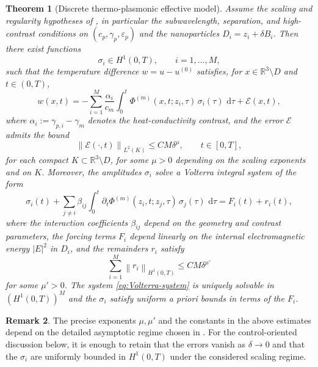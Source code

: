 \documentclass[11pt,a4paper]{article}
\numberwithin{equation}{section}
\newtheorem{theorem}{Theorem}[section]
\theoremstyle{definition}
\newtheorem{remark}[theorem]{Remark}
\newcommand{\R}{\mathbb{R}}
\newcommand{\eps}{\varepsilon}
\newcommand{\1}{\mathbbm{1}}
\newcommand{\dd}{\,\mathrm{d}}
\newcommand{\norm}[1]{\left\| #1 \right\|}
\begin{document}
\begin{theorem}[Discrete thermo-plasmonic effective model]
\label{thm:discrete-effective}
Assume the scaling and regularity hypotheses of \cite{CaoMukherjeeSini2025},
in particular the subwavelength, separation, and high-contrast conditions on
$(c_p,\gamma_p,\eps_p)$ and the nanoparticles $D_i = z_i + \delta B_i$.
Then there exist functions
\[
\sigma_i\in H^1(0,T),\qquad i=1,\dots,M,
\]
such that the temperature difference $w=u-u^{(0)}$ satisfies, for
$x\in\R^3\setminus D$ and $t\in(0,T)$,
\begin{equation}
\label{eq:discrete-expansion}
w(x,t) = -\sum_{i=1}^M \frac{\alpha_i}{c_m}\int_0^t
\Phi^{(m)}(x,t;z_i,\tau)\,\sigma_i(\tau)\,\dd\tau + \mathcal{E}(x,t),
\end{equation}
where $\alpha_i:=\gamma_{p,i}-\gamma_m$ denotes the heat-conductivity
contrast, and the error $\mathcal{E}$ admits the bound
\[
\norm{\mathcal{E}(\cdot,t)}_{L^2(K)} \le C M\delta^\mu,\qquad t\in[0,T],
\]
for each compact $K\subset\R^3\setminus D$, for some $\mu>0$ depending on
the scaling exponents and on $K$.
\newline
Moreover, the amplitudes $\sigma_i$ solve a Volterra integral system of the
form
\begin{equation}
\label{eq:Volterra-system}
\sigma_i(t) + \sum_{j\ne i}\beta_{ij} \int_0^t
\partial_t\Phi^{(m)}(z_i,t;z_j,\tau)\,\sigma_j(\tau)\,\dd\tau
= F_i(t) + r_i(t),
\end{equation}
where the interaction coefficients $\beta_{ij}$ depend on the geometry and
contrast parameters, the forcing terms $F_i$ depend linearly on the internal
electromagnetic energy $|E|^2$ in $D_i$, and the remainders $r_i$ satisfy
\[
\sum_{i=1}^M \norm{r_i}_{H^1(0,T)} \le C M\delta^{\mu'}
\]
for some $\mu'>0$. The system \eqref{eq:Volterra-system} is uniquely
solvable in $(H^1(0,T))^M$ and the $\sigma_i$ satisfy uniform a priori
bounds in terms of the $F_i$.
\end{theorem}

\begin{remark}
The precise exponents $\mu,\mu'$ and the constants in the above estimates
depend on the detailed asymptotic regime chosen in \cite{CaoMukherjeeSini2025}.
For the control-oriented discussion below, it is enough to retain that the
errors vanish as $\delta\to0$ and that the $\sigma_i$ are uniformly bounded
in $H^1(0,T)$ under the considered scaling regime.
\end{remark}
\end{document}
